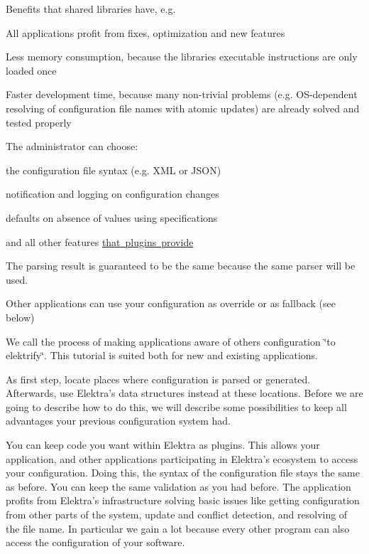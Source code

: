 \begin{DoxyItemize}
\item Benefits that shared libraries have, e.\+g.
\begin{DoxyItemize}
\item All applications profit from fixes, optimization and new features
\item Less memory consumption, because the libraries executable instructions are only loaded once
\item Faster development time, because many non-\/trivial problems (e.\+g. O\+S-\/dependent resolving of configuration file names with atomic updates) are already solved and tested properly
\end{DoxyItemize}
\item The administrator can choose\+:
\begin{DoxyItemize}
\item the configuration file syntax (e.\+g. X\+ML or J\+S\+ON)
\item notification and logging on configuration changes
\item defaults on absence of values using specifications
\item and all other features \mbox{\hyperlink{src_plugins_README_md}{that plugins provide}}
\end{DoxyItemize}
\item The parsing result is guaranteed to be the same because the same parser will be used.
\item Other applications can use your configuration as override or as fallback (see below)
\end{DoxyItemize}

We call the process of making applications aware of other\textquotesingle{}s configuration \char`\"{}to elektrify\char`\"{}. This tutorial is suited both for new and existing applications.

As first step, locate places where configuration is parsed or generated. Afterwards, use Elektra’s data structures instead at these locations. Before we are going to describe how to do this, we will describe some possibilities to keep all advantages your previous configuration system had.

You can keep code you want within Elektra as plugins. This allows your application, and other applications participating in Elektra’s ecosystem to access your configuration. Doing this, the syntax of the configuration file stays the same as before. You can keep the same validation as you had before. The application profits from Elektra’s infrastructure solving basic issues like getting configuration from other parts of the system, update and conflict detection, and resolving of the file name. In particular we gain a lot because every other program can also access the configuration of your software.

